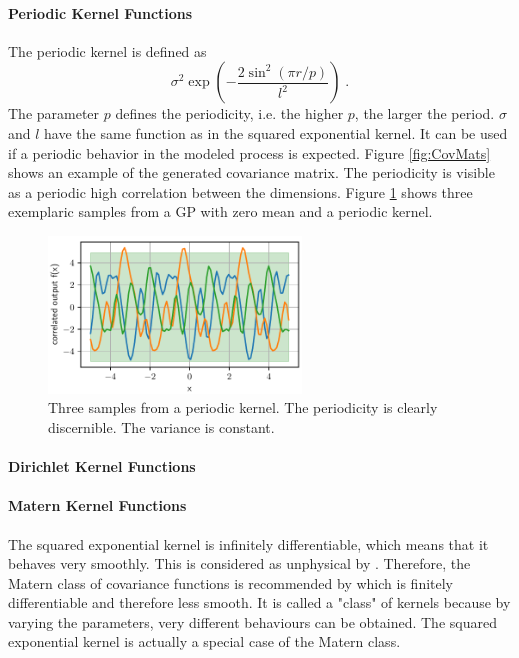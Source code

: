 \documentclass[%
  a4paper,oneside,%
  11pt,%
  smallchapters,
  style=printdev,
  extramargin,
  green,%
  rgb, <cmyk>
  ]{tubsbook}
\begin{document}
\paragraph{Periodic Kernel Functions}
The periodic kernel is defined as
\begin{equation}
\sigma^2 \exp(- \frac{2 \sin^2 (\pi r /p)}{l^2}) \;.
\end{equation}
The parameter $p$ defines the periodicity, i.e. the higher $p$, the larger the period.  $\sigma$ and $l$ have the same function as in the squared exponential kernel. \cite{Duvenaud}
It can be used if a periodic behavior in the modeled process is expected. Figure \ref{fig:CovMats} shows an example of the generated covariance matrix. The periodicity is visible as a periodic high correlation between the dimensions. Figure \ref{fig:Periodic} shows three exemplaric samples from a GP with zero mean and a periodic kernel.
\begin{figure}[!ht]
\begin{center}
\includegraphics[width=0.6\textwidth]{pics/PeriodicKernel.pdf}
\caption{Three samples from a periodic kernel. The periodicity is clearly discernible. The variance is constant.}
\label{fig:Periodic}
\end{center}
\end{figure}



\paragraph{Dirichlet Kernel Functions}


\paragraph{Matern Kernel Functions}
\cite{rasmussen2006} The squared exponential kernel is infinitely differentiable, which means that it behaves very smoothly. This is considered as unphysical by \cite{stein1999}. Therefore, the Matern class of covariance functions \cite{matern2013} is recommended by \cite{stein1999} which is finitely differentiable and therefore less smooth. It is called a "class" of kernels because by varying the parameters, very different behaviours can be obtained. The squared exponential kernel is actually a special case of the Matern class.
\end{document}
